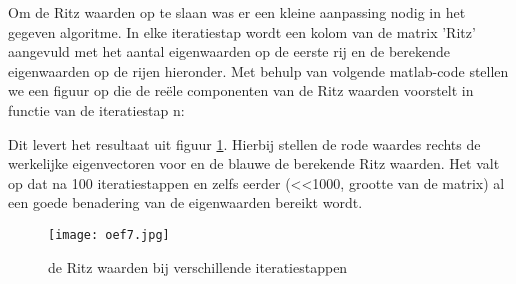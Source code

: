 Om de Ritz waarden op te slaan was er een kleine aanpassing nodig in het gegeven algoritme. In elke iteratiestap wordt een kolom van de matrix 'Ritz' aangevuld  met het aantal eigenwaarden op de eerste rij en de berekende eigenwaarden op de rijen hieronder. Met behulp van volgende matlab-code stellen we een figuur op die de re\"ele componenten van de Ritz waarden voorstelt in functie van de iteratiestap n:


Dit levert het resultaat uit figuur \ref{fig:oef7}. Hierbij stellen de rode waardes rechts de werkelijke eigenvectoren voor en de blauwe de berekende Ritz waarden. Het valt op dat na 100 iteratiestappen en zelfs eerder (<<1000, grootte van de matrix) al een goede benadering van de eigenwaarden bereikt wordt.

\begin{figure}[H]
    \centering
    \texttt{[image: oef7.jpg]}
    \caption{de Ritz waarden bij verschillende iteratiestappen}
    \label{fig:oef7}
\end{figure}